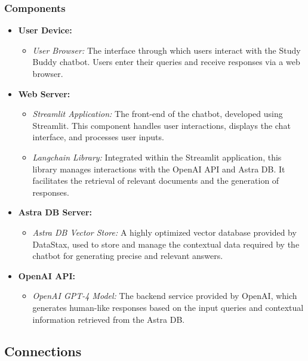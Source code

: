 \subsubsection*{Components}

\begin{itemize}
    \item \textbf{User Device:}
    \begin{itemize}
        \item \textit{User Browser:} The interface through which users interact with the Study Buddy chatbot. Users enter their queries and receive responses via a web browser.
    \end{itemize}
    \item \textbf{Web Server:}
    \begin{itemize}
        \item \textit{Streamlit Application:} The front-end of the chatbot, developed using Streamlit. This component handles user interactions, displays the chat interface, and processes user inputs.
        \item \textit{Langchain Library:} Integrated within the Streamlit application, this library manages interactions with the OpenAI API and Astra DB. It facilitates the retrieval of relevant documents and the generation of responses.
    \end{itemize}
    \item \textbf{Astra DB Server:}
    \begin{itemize}
        \item \textit{Astra DB Vector Store:} A highly optimized vector database provided by DataStax, used to store and manage the contextual data required by the chatbot for generating precise and relevant answers.
    \end{itemize}
    \item \textbf{OpenAI API:}
    \begin{itemize}
        \item \textit{OpenAI GPT-4 Model:} The backend service provided by OpenAI, which generates human-like responses based on the input queries and contextual information retrieved from the Astra DB.
    \end{itemize}
\end{itemize}

\subsection{Connections}

